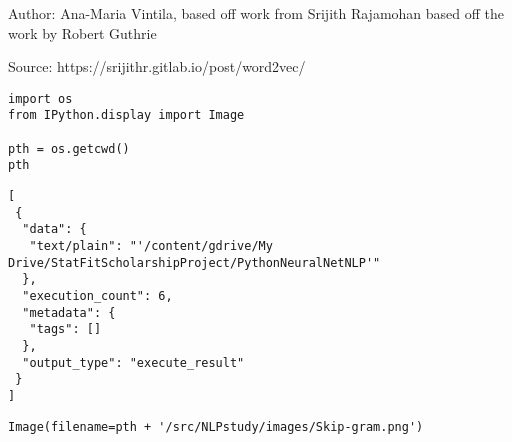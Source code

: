\documentclass[
]{article}
\author{}
\date{}
\begin{document}
Author: Ana-Maria Vintila, based off work from Srijith Rajamohan based
off the work by Robert Guthrie

Source: https://srijithr.gitlab.io/post/word2vec/

\begin{verbatim}
import os
from IPython.display import Image

pth = os.getcwd()
pth
\end{verbatim}

\begin{verbatim}
[
 {
  "data": {
   "text/plain": "'/content/gdrive/My Drive/StatFitScholarshipProject/PythonNeuralNetNLP'"
  },
  "execution_count": 6,
  "metadata": {
   "tags": []
  },
  "output_type": "execute_result"
 }
]
\end{verbatim}

\begin{verbatim}
Image(filename=pth + '/src/NLPstudy/images/Skip-gram.png')
\end{verbatim}
\end{document}
